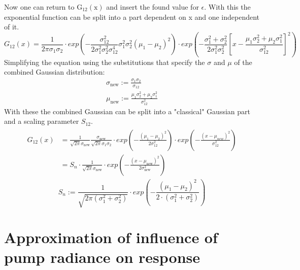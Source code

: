 \documentclass[twoside,openright,listof=numbered]{scrreprt}
\begin{document}
Now one can return to $\mathrm{G_{12}(x)}$ and insert the found value for $\epsilon$. With this the exponential function can be split into a part dependent on x and one independent of it.
\begin{equation*}
G_{12}(x) = \frac{1}{2\pi\sigma_1\sigma_2}\cdot exp\left(- \frac{\sigma_{12}^2}{2\sigma_1^2\sigma_2^2\sigma_{12}^4}\sigma_1^2\sigma_2^2\left(\mu_1-\mu_2\right)^2
\right) \cdot
exp\left(-\frac{\sigma_1^2+\sigma_2^2}{2\sigma_1^2\sigma_2^2} \left[x - \frac{\mu_1\sigma_2^2+\mu_2\sigma_1^2}{\sigma_{12}^2}\right]^2 \right)
\end{equation*}
Simplifying the equation using the substitutions that specify the $\sigma$ and $\mu$ of the combined Gaussian distribution:
\begin{gather*}
\sigma_\text{new} := \frac{\sigma_1\sigma_2}{\sigma_{12}}\\
\mu_\text{new} := \frac{\mu_1\sigma_2^2+ \mu_2\sigma_1^2}{\sigma_{12}^2}
\end{gather*}
With these the combined Gaussian can be split into a "classical" Gaussian part and a scaling parameter $S_{12}$.
\begin{gather*}
\begin{split}
G_{12}(x) & = \frac{1}{\sqrt{2\pi}\sigma_\text{new}}\frac{\sigma_\text{new}}{\sqrt{2\pi}\sigma_1\sigma_2}\cdot exp\left(- \frac{\left(\mu_1-\mu_2\right)^2}{2\sigma_{12}^2}\right) \cdot
exp\left(-\frac{\left(x-\mu_{new}\right)^2}{\sigma_{12}^2}\right)\\
& = S_n \cdot \frac{1}{\sqrt{2\pi}\sigma_\text{new}} \cdot exp\left(-\frac{\left(x-\mu_\text{new}\right)^2}{2\sigma_\text{new}^2}\right)
\end{split}
\end{gather*}
\begin{equation*}
S_{n} := \dfrac{1}{\sqrt{2\pi\left(\sigma_1^2+\sigma_2^2\right)}}\cdot exp\left(-\dfrac{\left(\mu_1 - \mu_2\right)^2}{2\cdot \left(\sigma_1^2+\sigma_2^2\right)}\right)
\end{equation*}

\section{Approximation of influence of pump radiance on response}\label{deriv:RadianceResponse}
\end{document}
